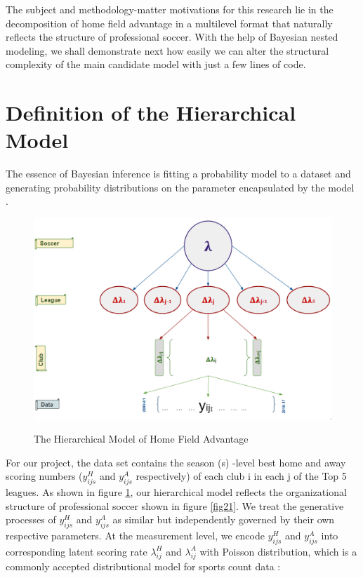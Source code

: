 \documentclass[USenglish]{article}
\begin{document}
The subject and methodology-matter motivations for this research lie in the decomposition of home field advantage in a multilevel format that naturally reflects the structure of professional soccer. With the help of Bayesian nested modeling, we shall demonstrate next how easily we can alter the structural complexity of the main candidate model with just a few lines of code.

\section{Definition of the Hierarchical Model} 

The essence of Bayesian inference is fitting a probability model to a dataset and generating probability distributions on the parameter encapsulated by the model \citep{Gelman2014}.

\begin{figure}
\caption{The Hierarchical Model of Home Field Advantage }
{\includegraphics[width=1.0\linewidth]{HFA_33}}
\label{fig33}
\end{figure} 

 
For our project, the data set contains the season (s) -level best home and away scoring numbers ($y^H_{ijs}$ and   $y^A_{ijs}$ respectively) of each club i in each j of the Top 5 leagues. As shown in figure \ref{fig33}, our hierarchical model reflects the organizational structure of professional soccer shown in figure \ref{fig21}. We treat the generative processes of $y^H_{ijs}$ and $y^A_{ijs}$ as similar but independently governed by their own respective parameters. At the measurement level, we encode $y^H_{ijs}$ and $y^A_{ijs}$ into corresponding latent scoring rate $\lambda^H_{ij}$ and $\lambda^A_{ij}$ with Poisson distribution, which is a commonly accepted distributional model for sports count data \citep{Miller2015}:
\end{document}
